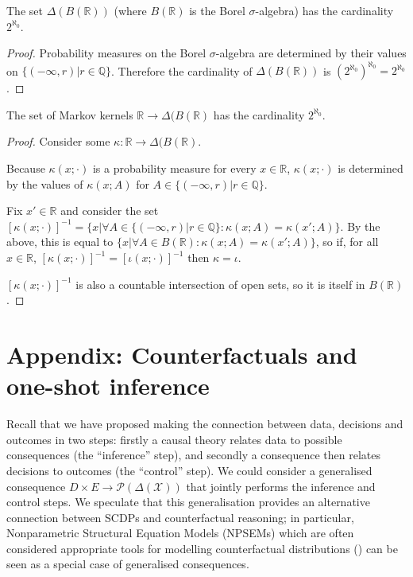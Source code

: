\begin{lemma}
The set $\Delta(B(\mathbb{R}))$ (where $B(\mathbb{R})$ is the Borel $\sigma$-algebra) has the cardinality $2^{\aleph_0}$.
\end{lemma}

\begin{proof}
Probability measures on the Borel $\sigma$-algebra are determined by their values on $\{(-\infty,r)|r\in \mathbb{Q}\}$. Therefore the cardinality of $\Delta(B(\mathbb{R}))$ is $(2^{\aleph_0})^{\aleph_0}=2^{\aleph_0}$.
\end{proof}

\begin{lemma}
The set of Markov kernels $\mathbb{R}\to \Delta(B(\mathbb{R})$ has the cardinality $2^{\aleph_0}$.
\end{lemma}

\begin{proof}
Consider some $\kappa:\mathbb{R}\to \Delta(B(\mathbb{R})$.

Because $\kappa(x;\cdot)$ is a probability measure for every $x\in \mathbb{R}$, $\kappa(x;\cdot)$ is determined by the values of $\kappa(x;A)$ for $A\in \{(-\infty,r)|r\in \mathbb{Q}\}$.

Fix $x'\in \mathbb{R}$ and consider the set $[\kappa(x;\cdot)]^{-1} = \{x|\forall A\in \{(-\infty,r)|r\in \mathbb{Q}\}:\kappa(x;A) = \kappa(x';A)\}$. By the above, this is equal to $\{x|\forall A\in B(\mathbb{R}):\kappa(x;A) = \kappa(x';A)\}$, so if, for all $x\in \mathbb{R}$, $[\kappa(x;\cdot)]^{-1}=[\iota(x;\cdot)]^{-1}$ then $\kappa=\iota$. 

$[\kappa(x;\cdot)]^{-1}$ is also a countable intersection of open sets, so it is itself in $B(\mathbb{R})$.

\end{proof}

\section{Appendix: Counterfactuals and one-shot inference}

Recall that we have proposed making the connection between data, decisions and outcomes in two steps: firstly a causal theory relates data to possible consequences (the ``inference'' step), and secondly a consequence then relates decisions to outcomes (the ``control'' step). We could consider a generalised consequence $D\times E\to \mathscr{P}(\Delta(\mathcal{X}))$ that jointly performs the inference and control steps. We speculate that this generalisation provides an alternative connection between SCDPs and counterfactual reasoning; in particular, Nonparametric Structural Equation Models (NPSEMs) which are often considered appropriate tools for modelling counterfactual distributions (\cite{pearl_causality:_2009,richardson2013single}) can be seen as a special case of generalised consequences.

